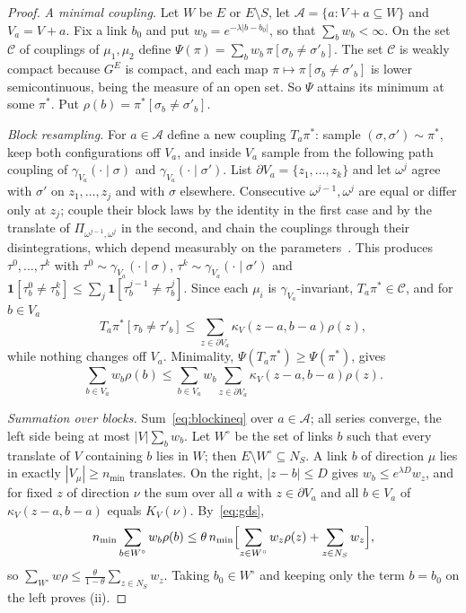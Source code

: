 \documentclass[11pt]{amsart}
\theoremstyle{definition}
\theoremstyle{remark}
\begin{document}
\begin{proof}
\emph{A minimal coupling.} Let $W$ be $E$ or $E\setminus S$, let $\mathcal A=
\{a:V+a\subseteq W\}$ and $V_a=V+a$. Fix a link $b_0$ and put $w_b=e^{-\lambda
|b-b_0|}$, so that $\sum_bw_b<\infty$. On the set $\mathcal C$ of couplings of
$\mu_1,\mu_2$ define $\Psi(\pi)=\sum_bw_b\,\pi[\sigma_b\ne\sigma'_b]$. The set
$\mathcal C$ is weakly compact because $G^E$ is compact, and each map
$\pi\mapsto\pi[\sigma_b\ne\sigma'_b]$ is lower semicontinuous, being the measure
of an open set. So $\Psi$ attains its minimum at some $\pi^*$. Put
$\rho(b)=\pi^*[\sigma_b\ne\sigma'_b]$.

\emph{Block resampling.} For $a\in\mathcal A$ define a new coupling $T_a\pi^*$:
sample $(\sigma,\sigma')\sim\pi^*$, keep both configurations off $V_a$, and
inside $V_a$ sample from the following path coupling of
$\gamma_{V_a}(\cdot\mid\sigma)$ and $\gamma_{V_a}(\cdot\mid\sigma')$. List
$\partial V_a=\{z_1,\dots,z_k\}$ and let $\omega^j$ agree with $\sigma'$ on
$z_1,\dots,z_j$ and with $\sigma$ elsewhere. Consecutive $\omega^{j-1},\omega^j$
are equal or differ only at $z_j$; couple their block laws by the identity in
the first case and by the translate of $\Pi_{\omega^{j-1},\omega^j}$ in the
second, and chain the couplings through their disintegrations, which depend
measurably on the parameters~\cite[Ch.~3]{Kal21}. This produces
$\tau^0,\dots,\tau^k$ with $\tau^0\sim\gamma_{V_a}(\cdot\mid\sigma)$,
$\tau^k\sim\gamma_{V_a}(\cdot\mid\sigma')$ and $\mathbf 1[\tau^0_b\ne\tau^k_b]
\le\sum_j\mathbf 1[\tau^{j-1}_b\ne\tau^j_b]$. Since each $\mu_i$ is
$\gamma_{V_a}$-invariant, $T_a\pi^*\in\mathcal C$, and for $b\in V_a$
\[
T_a\pi^*[\tau_b\ne\tau'_b]\le\sum_{z\in\partial V_a}\kappa_V(z-a,b-a)\rho(z),
\]
while nothing changes off $V_a$. Minimality, $\Psi(T_a\pi^*)\ge\Psi(\pi^*)$,
gives
\begin{equation}\label{eq:blockineq}
\sum_{b\in V_a}w_b\rho(b)\le\sum_{b\in V_a}w_b\sum_{z\in\partial V_a}
\kappa_V(z-a,b-a)\rho(z).
\end{equation}

\emph{Summation over blocks.} Sum~\eqref{eq:blockineq} over $a\in\mathcal A$;
all series converge, the left side being at most $|V|\sum_bw_b$. Let $W^\circ$
be the set of links $b$ such that every translate of $V$ containing $b$ lies in
$W$; then $E\setminus W^\circ\subseteq N_S$. A link $b$ of direction $\mu$ lies
in exactly $|V_\mu|\ge n_{\min}$ translates. On the right, $|z-b|\le D$ gives
$w_b\le e^{\lambda D}w_z$, and for fixed $z$ of direction $\nu$ the sum over all
$a$ with $z\in\partial V_a$ and all $b\in V_a$ of $\kappa_V(z-a,b-a)$ equals
$K_V(\nu)$. By~\eqref{eq:gds},
\[
n_{\min}\sum_{b\in W^\circ}w_b\rho(b)\le\theta\,n_{\min}\Bigl[\sum_{z\in
W^\circ}w_z\rho(z)+\sum_{z\in N_S}w_z\Bigr],
\]
so $\sum_{W^\circ}w\rho\le\frac{\theta}{1-\theta}\sum_{z\in N_S}w_z$. Taking
$b_0\in W^\circ$ and keeping only the term $b=b_0$ on the left proves (ii).


\end{proof}
\end{document}
